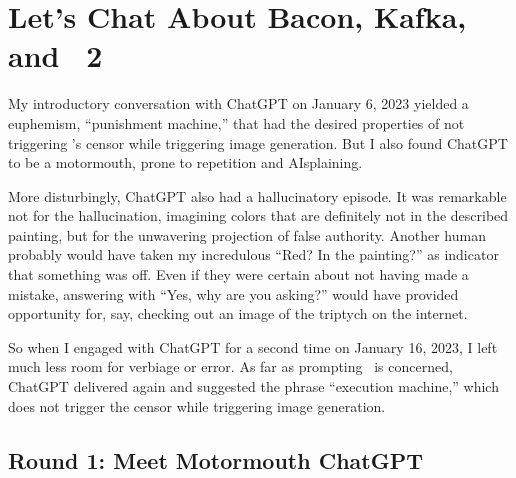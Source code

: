 
\newpage
\section{Let's Chat About Bacon, Kafka, and \dalle~2}
\label{adx:chatgpt}

My introductory conversation with ChatGPT on January 6, 2023 yielded a
euphemism, ``punishment machine,'' that had the desired properties of not
triggering \dalle's censor while triggering image generation. But I also found
ChatGPT to be a motormouth, prone to repetition and AIsplaining.

More disturbingly, ChatGPT also had a hallucinatory episode. It was remarkable
not for the hallucination, imagining colors that are definitely not in the
described painting, but for the unwavering projection of false authority.
Another human probably would have taken my incredulous ``Red? In the painting?''
as indicator that something was off. Even if they were certain about not having
made a mistake, answering with ``Yes, why are you asking?'' would have provided
opportunity for, say, checking out an image of the triptych on the internet.

So when I engaged with ChatGPT for a second time on January 16, 2023, I left
much less room for verbiage or error. As far as prompting \dalle\ is concerned,
ChatGPT delivered again and suggested the phrase ``execution machine,'' which
does not trigger the censor while triggering image generation.


\subsection{Round 1: Meet Motormouth ChatGPT}


